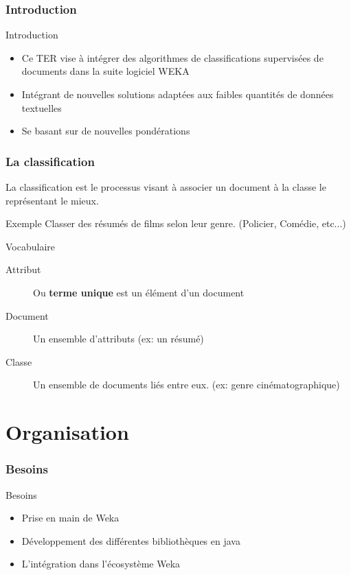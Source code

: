 \documentclass[12pt]{beamer}
\begin{document}
\begin{frame}
\frametitle{Introduction}
\begin{block}{Introduction}
\begin{itemize}
\item Ce TER vise à intégrer des algorithmes de classifications supervisées de documents dans la suite logiciel WEKA
\item Intégrant de nouvelles solutions adaptées aux faibles quantités de données textuelles
\item Se basant sur de nouvelles pondérations
\end{itemize} 
\end{block}
\end{frame}
\begin{frame}
\frametitle{La classification}
La classification est le processus visant à associer un document à la classe le représentant le mieux.
\begin{block}{Exemple}
Classer des résumés de films selon leur genre. (Policier, Comédie, etc...)
\end{block}
\begin{block}{Vocabulaire}
\begin{description}
\item[Attribut] Ou \textbf{terme unique} est un élément d'un document
\item[Document] Un ensemble d'attributs (ex: un résumé)
\item[Classe] Un ensemble de documents liés entre eux. (ex: genre cinématographique)
\end{description}
\end{block}


\end{frame}


\section{Organisation}
\begin{frame}
\frametitle{Besoins}
\begin{block}{Besoins}
\begin{itemize}
\item Prise en main de Weka
\item Développement des différentes bibliothèques en java
\item L'intégration dans l’écosystème Weka
\end{itemize}
\end{block}

\end{frame}
\end{document}
